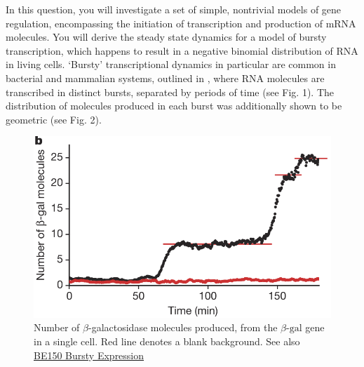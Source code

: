 \documentclass[11pt]{exam}
\begin{document}
\begin{questions}
\question[50]

In this question, you will investigate a set of simple, nontrivial models of gene regulation, encompassing the initiation of transcription and production of mRNA molecules. You will derive the steady state dynamics for a model of bursty transcription, which happens to result in a negative binomial distribution of RNA in living cells. `Bursty' transcriptional dynamics in particular are common in bacterial and mammalian systems, outlined in \cite{Cai2006-hk}, where RNA molecules are transcribed in distinct bursts, separated by periods of time (see Fig. 1). The distribution of molecules produced in each burst was additionally shown to be geometric (see Fig. 2). \\

\begin{figure}[!htb]
        \centering
        \includegraphics[scale=0.75]{Figures/bursts.png}
        \caption{Number of $\beta$-galactosidase molecules produced, from the $\beta\text{-gal}$ gene in a single cell. Red line denotes a blank background. See also \href{http://be150.caltech.edu/2020/content/lessons/11_bursty.html}{BE150 Bursty Expression} }
    \end{figure}



\end{questions}
\end{document}
